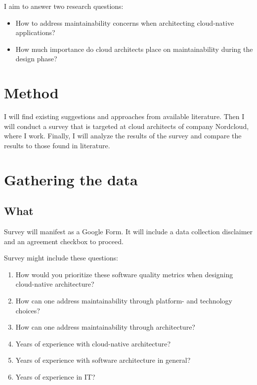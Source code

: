 \documentclass[utf8,english]{gradu3}
\begin{document}
I aim to answer two research questions:
\begin{itemize}
  \item How to address maintainability concerns when architecting cloud-native
        applications?
  \item How much importance do cloud architects place on maintainability during
        the design phase?
\end{itemize}


\chapter{Method}

I will find existing suggestions and approaches from available literature.
Then I will conduct a survey that is targeted at cloud architects of
company Nordcloud, where I work.
Finally, I will analyze the results of the survey and compare the results to
those found in literature.


\chapter{Gathering the data}

\section{What}
Survey will manifest as a Google Form.
It will include a data collection disclaimer and an agreement checkbox to proceed.

Survey might include these questions:
\begin{enumerate}
  \item How would you prioritize these software quality metrics when designing cloud-native
        architecture?
  \item How can one address maintainability through platform- and technology choices?
  \item How can one address maintainability through architecture?
  \item Years of experience with cloud-native architecture?
  \item Years of experience with software architecture in general?
  \item Years of experience in IT?
\end{enumerate}
\end{document}
